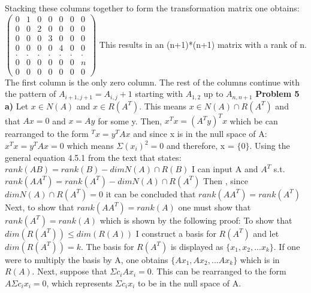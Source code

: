 \documentclass[12pt]{article}
\begin{document}
\newline
Stacking these columns together to form the transformation matrix one obtains: $\left(\begin{array}{ccccccc} 0&1&0&0&0&0&0  \\ 0&0&2&0&0&0&0 \\ 0&0&0&3&0&0&0 \\ 0&0&0&0&4&0&0 \\ .&.&.&.&.&.&. \\ 0&0&0&0&0&0&n \\ 0&0&0&0&0&0&0 \end{array}\right)$ 
\newline
This results in an (n+1)*(n+1) matrix with a rank of n. The first column is the only zero column. The rest of the columns continue with the pattern of $A_{i+1,j+1} = A_{i,j} + 1$ starting with $A_{1,2}$ up to $A_{n,n+1}$
\newline
\newline
\textbf{Problem 5}
\newline
\textbf{a)}
\newline
Let $x \in N(A)$ and $x \in R(A^{T})$. This means $x \in N(A) \cap R(A^{T})$ and that $Ax = 0$ and $x = Ay$ for some y.
\newline
Then, $x^{T}x = (A^{T}y)^{T}x$ which be can rearranged to the form $^{T}x = y^{T}Ax$ and since x is in the null space of A: $x^{T}x = y^{T}Ax = 0$ which means $\Sigma (x_{i})^{2} = 0$ and therefore, x = $\{0\}$.
\newline
Using the general equation 4.5.1 from the text that states: $rank(AB)= rank(B)- dimN(A) \cap R(B)$ I can input A and $A^{T}$ s.t. $rank(AA^{T})= rank(A^{T})- dimN(A) \cap R(A^{T})$
\newline
Then , since $dimN(A) \cap R(A^{T}) = 0$ it can be concluded that $rank(AA^{T}) = rank(A^{T})$
\newline
Next, to show that $rank(AA^{T}) = rank(A)$ one must show that $rank(A^{T}) = rank(A)$ which is shown by the following proof:
\newline
To show that $dim(R(A^{T})) \leq dim(R(A)) $ I construct a basis for $R(A^{T})$ and let $dim(R(A^{T})) = k$. The basis for $R(A^{T})$ is displayed as $\{x_{1}, x_{2}, ... x_{k} \}$.
\newline
If one were to multiply the basis by A, one obtains $\{Ax_{1}, Ax_{2}, ... Ax_{k} \}$ which is in $R(A)$. Next, suppose that $\Sigma c_{i}Ax_{i} = 0 $. This can be rearranged to the form $A \Sigma c_{i}x_{i} = 0 $, which represents $\Sigma c_{i}x_{i}$ to be in the null space of A. 
\end{document}
